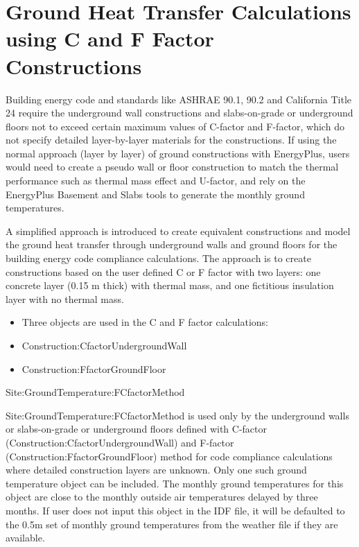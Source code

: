 \section{Ground Heat Transfer Calculations using C and F Factor Constructions}\label{ground-heat-transfer-calculations-using-c-and-f-factor-constructions}

Building energy code and standards like ASHRAE 90.1, 90.2 and California Title 24 require the underground wall constructions and slabs-on-grade or underground floors not to exceed certain maximum values of C-factor and F-factor, which do not specify detailed layer-by-layer materials for the constructions. If using the normal approach (layer by layer) of ground constructions with EnergyPlus, users would need to create a pseudo wall or floor construction to match the thermal performance such as thermal mass effect and U-factor, and rely on the EnergyPlus Basement and Slabs tools to generate the monthly ground temperatures.

A simplified approach is introduced to create equivalent constructions and model the ground heat transfer through underground walls and ground floors for the building energy code compliance calculations. The approach is to create constructions based on the user defined C or F factor with two layers: one concrete layer (0.15 m thick) with thermal mass, and one fictitious insulation layer with no thermal mass.

\begin{itemize}
\item
  Three objects are used in the C and F factor calculations:
\item
  Construction:CfactorUndergroundWall
\item
  Construction:FfactorGroundFloor
\end{itemize}

Site:GroundTemperature:FCfactorMethod

Site:GroundTemperature:FCfactorMethod is used only by the underground walls or slabs-on-grade or underground floors defined with C-factor (Construction:CfactorUndergroundWall) and F-factor (Construction:FfactorGroundFloor) method for code compliance calculations where detailed construction layers are unknown. Only one such ground temperature object can be included. The monthly ground temperatures for this object are close to the monthly outside air temperatures delayed by three months. If user does not input this object in the IDF file, it will be defaulted to the 0.5m set of monthly ground temperatures from the weather file if they are available.

